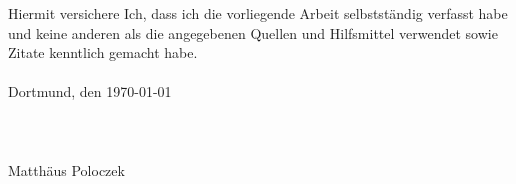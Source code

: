 \cleardoublepage
\normalsize
Hiermit versichere Ich, dass ich die vorliegende Arbeit selbstständig verfasst habe und keine anderen als die angegebenen Quellen und Hilfsmittel verwendet sowie Zitate kenntlich gemacht habe.\\\\
Dortmund, den \today \\\\\\\\
Matthäus Poloczek
